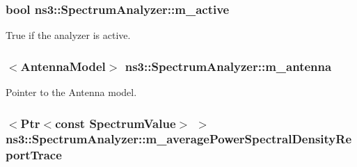 \subsubsection[{\texorpdfstring{m\+\_\+active}{m_active}}]{\setlength{\rightskip}{0pt plus 5cm}bool ns3\+::\+Spectrum\+Analyzer\+::m\+\_\+active\hspace{0.3cm}{\ttfamily [private]}}\hypertarget{classns3_1_1SpectrumAnalyzer_a425c27e634215a0d3651a947f7c15e0b}{}\label{classns3_1_1SpectrumAnalyzer_a425c27e634215a0d3651a947f7c15e0b}


True if the analyzer is active. 

\subsubsection[{\texorpdfstring{m\+\_\+antenna}{m_antenna}}]{$<${\bf Antenna\+Model}$>$ ns3\+::\+Spectrum\+Analyzer\+::m\+\_\+antenna\hspace{0.3cm}{\ttfamily [private]}}\hypertarget{classns3_1_1SpectrumAnalyzer_a5f7f5c7405004b22d6b0ba8c68a69dd6}{}\label{classns3_1_1SpectrumAnalyzer_a5f7f5c7405004b22d6b0ba8c68a69dd6}


Pointer to the Antenna model. 

\subsubsection[{\texorpdfstring{m\+\_\+average\+Power\+Spectral\+Density\+Report\+Trace}{m_averagePowerSpectralDensityReportTrace}}]{$<${\bf Ptr}$<$const {\bf Spectrum\+Value}$>$ $>$ ns3\+::\+Spectrum\+Analyzer\+::m\+\_\+average\+Power\+Spectral\+Density\+Report\+Trace\hspace{0.3cm}{\ttfamily [private]}}\hypertarget{classns3_1_1SpectrumAnalyzer_a014909438325c07fe2f55a027e3fde90}{}\label{classns3_1_1SpectrumAnalyzer_a014909438325c07fe2f55a027e3fde90}


